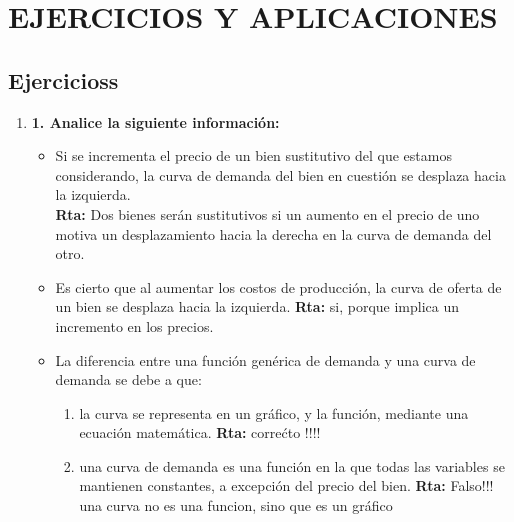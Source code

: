 \documentclass[12pt]{book}
\begin{document}
\chapter{EJERCICIOS Y APLICACIONES}
\section{Ejercicioss}
\begin{enumerate}
\item \textbf{1. Analice la siguiente información:}
\\
\begin{itemize}
\item Si se incrementa el precio de un bien sustitutivo del que estamos considerando, la curva de demanda del bien en cuestión se desplaza hacia la izquierda.
\\
\textbf{Rta: }Dos bienes serán sustitutivos si un aumento en el precio de uno motiva un desplazamiento hacia la
derecha en la curva de demanda del otro.


\item Es cierto que al aumentar los costos de producción, la curva de oferta de un bien se desplaza hacia la izquierda.
\textbf{Rta: }si, porque implica un incremento en los precios.
\item La diferencia entre una función genérica de demanda y una curva de demanda se debe a que:
\begin{enumerate}
\item la curva se representa en un gráfico, y la función, mediante una ecuación matemática.
\textbf{Rta: } corre\'cto !!!!
\item una curva de demanda es una función en la que todas las variables se mantienen constantes, a excepción del precio del bien.
\textbf{Rta: }Falso!!! una curva no es una funcion, sino que es un gr\'afico
\end{enumerate}
\end{itemize}




\end{enumerate}
\end{document}
